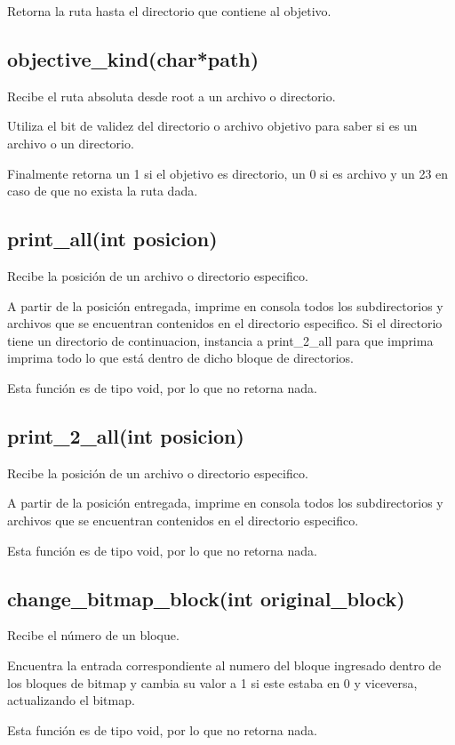 \documentclass[12pt]{article}
\begin{document}
Retorna la ruta hasta el directorio que contiene al objetivo.

\subsection{objective\_kind(char*path)}
Recibe el ruta absoluta desde root a un archivo o directorio.

Utiliza el bit de validez del directorio o archivo objetivo para saber si es un archivo o un directorio.

Finalmente retorna un 1 si el objetivo es directorio, un 0 si es archivo y un 23 en caso de que no exista la ruta dada.

\subsection{print\_all(int posicion)}
Recibe la posición de un archivo o directorio especifico.

A partir de la posición entregada, imprime en consola todos los subdirectorios y archivos que se encuentran contenidos en el directorio especifico. Si el directorio tiene un directorio de continuacion, instancia a print\_2\_all para que imprima imprima todo lo que está dentro de dicho bloque de directorios.

Esta función es de tipo void, por lo que no retorna nada.

\subsection{print\_2\_all(int posicion)}
Recibe la posición de un archivo o directorio especifico.

A partir de la posición entregada, imprime en consola todos los subdirectorios y archivos que se encuentran contenidos en el directorio especifico.

Esta función es de tipo void, por lo que no retorna nada.

\subsection{change\_bitmap\_block(int original\_block)}
Recibe el número de un bloque.

Encuentra la entrada correspondiente al numero del bloque ingresado dentro de los bloques de bitmap y cambia su valor a 1 si este estaba en 0 y viceversa, actualizando el bitmap.

Esta función es de tipo void, por lo que no retorna nada.
\end{document}
